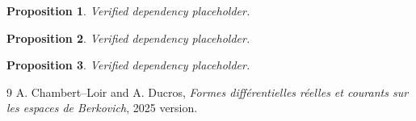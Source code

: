 \documentclass[11pt]{article}
\newtheorem{proposition}{Proposition}
\begin{document}
\begin{proposition}\label{prop:p062-rational-centred-traces}
Verified dependency placeholder.
\end{proposition}
\begin{proposition}\label{prop:p062-finite-flat-continuous-trace}
Verified dependency placeholder.
\end{proposition}
\begin{proposition}\label{prop:p062-arbitrary-field-disc}
Verified dependency placeholder.
\end{proposition}


\begin{thebibliography}{9}
 A. Chambert--Loir and A. Ducros,
\emph{Formes différentielles réelles et courants sur les espaces de
Berkovich}, 2025 version.
\end{thebibliography}
\end{document}
